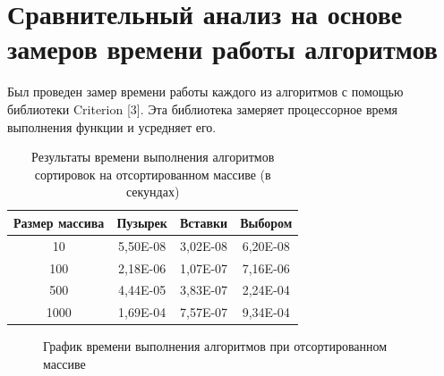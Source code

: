 \documentclass[a4paper,14pt, unknownkeysallowed]{extreport}
\begin{document}
\section{Сравнительный анализ на основе замеров времени работы алгоритмов}
	
	Был проведен замер времени работы каждого из алгоритмов с помощью библиотеки Criterion [3]. Эта библиотека замеряет процессорное время выполнения функции и усредняет его.

    \begin{table}[]
        \centering
        \begin{tabular}{|c|c|c|c|}
        \hline
        Размер массива & Пузырек  & Вставки  & Выбором  \\ \hline
        10             & 5,50E-08 & 3,02E-08 & 6,20E-08 \\ \hline
        100            & 2,18E-06 & 1,07E-07 & 7,16E-06 \\ \hline
        500            & 4,44E-05 & 3,83E-07 & 2,24E-04 \\ \hline
        1000           & 1,69E-04 & 7,57E-07 & 9,34E-04 \\ \hline
        \end{tabular}
        \caption{Результаты времени выполнения алгоритмов сортировок на отсортированном массиве (в секундах)}
        \label{tab:sorted_bench}
    \end{table}

    \begin{figure}[h]
        \centering
    \caption{График времени выполнения алгоритмов при отсортированном массиве}
    \end{figure}
\end{document}

